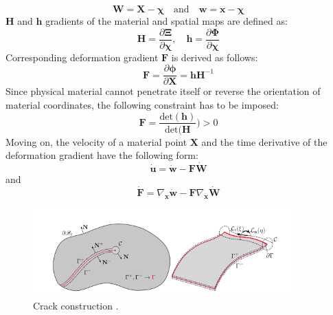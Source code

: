 \documentclass[11pt]{ACMEarticle}
\numberwithin{equation}{section}
\begin{document}
\begin{equation}
\mathbf W = \mathbf X - \mathbf \chi \quad \mathrm{and} \quad \mathbf w = \mathbf x - \mathbf \chi
\end{equation}
$\mathbf H$ and $\mathbf h$  gradients of the material and spatial maps are defined as:
\begin{equation}
\mathbf H = \frac{\partial \mathbf  \Xi}{\partial \mathbf \chi }, \quad \mathbf  h =  \frac{\partial \mathbf  \Phi}{\partial \mathbf \chi }
\end{equation}
Corresponding deformation gradient $\mathbf F $ is derived as follows:
\begin{equation}
\mathbf F =  \frac{\partial \mathbf  \phi }{\partial \mathbf X}=\mathbf h \mathbf H^{-1}
\end{equation}
Since physical material cannot penetrate itself or reverse the orientation of material coordinates, the following constraint has to be imposed:
\begin{equation}
\mathbf {F} = \frac{\mathrm {det} (\mathbf h)}{\mathrm {det} (\mathbf H}) > 0
\end{equation}
Moving on, the velocity of a material point $\mathbf X$ and the time derivative of the deformation gradient have the following form:
\begin{equation}\label{eq:crack_disp}
\mathbf{\dot{u}} = \mathbf{ \dot{w}} - \mathbf F \mathbf{ \dot{W}}
\end{equation}
and
\begin{equation}\label{eq:crack_def_grad}
\mathbf{\dot{F}} = \nabla_{\mathbf x} \mathbf{\dot{w}} - \mathbf F \nabla_{\mathbf x } \mathbf{\dot{W}}
\end{equation}
\begin{figure}
	\begin{centering}
		\includegraphics[width=10cm]{Figures/frac_crack_con}
		\caption{Crack construction \citep{kaczmarczyk2017energy}.}
		\label{fig:frac_crack_con}
	\end{centering}
\end{figure}
\end{document}
